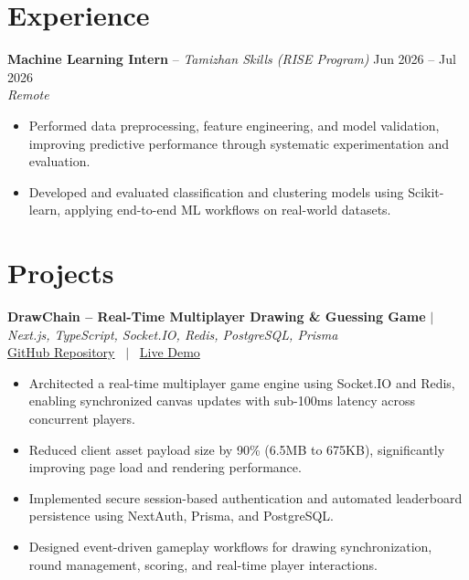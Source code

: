 \documentclass[10pt, a4paper]{article}
\begin{document}

\section{Experience}

\textbf{Machine Learning Intern} -- \textit{Tamizhan Skills (RISE Program)} \hfill Jun 2026 -- Jul 2026 \\
\textit{\small{Remote}} \\
\begin{itemize}

    \item Performed data preprocessing, feature engineering, and model validation, improving predictive performance through systematic experimentation and evaluation.

    \item Developed and evaluated classification and clustering models using Scikit-learn, applying end-to-end ML workflows on real-world datasets.

\end{itemize}
\vspace{2pt}



\section{Projects}

\textbf{DrawChain -- Real-Time Multiplayer Drawing \& Guessing Game} $|$ \textit{Next.js, TypeScript, Socket.IO, Redis, PostgreSQL, Prisma} \\

\small{
\href{https://github.com/PankajKumar-11/DrawChain}{GitHub Repository}
 \ $|$ \ \href{https://demo.example.com}{Live Demo}
} \\

\begin{itemize}

    \item Architected a real-time multiplayer game engine using Socket.IO and Redis, enabling synchronized canvas updates with sub-100ms latency across concurrent players.

    \item Reduced client asset payload size by 90\% (6.5MB to 675KB), significantly improving page load and rendering performance.

    \item Implemented secure session-based authentication and automated leaderboard persistence using NextAuth, Prisma, and PostgreSQL.

    \item Designed event-driven gameplay workflows for drawing synchronization, round management, scoring, and real-time player interactions.

\end{itemize}
\vspace{2pt}
\end{document}
